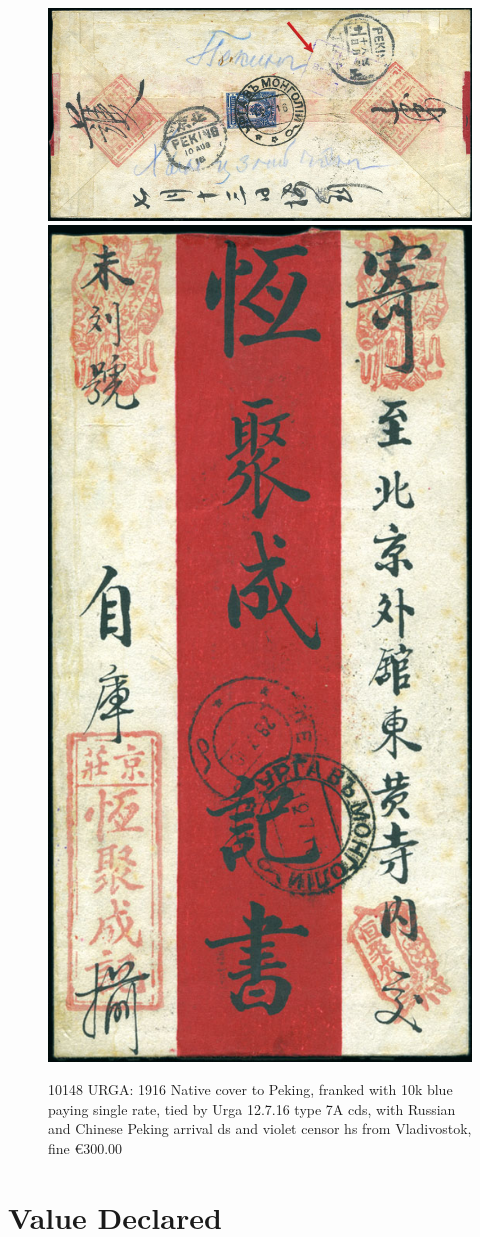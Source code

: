 \begin{figure}[htbp]
\centering
\includegraphics[width=.95\textwidth]{../russian-post-in-mongolia/10148.jpg}
\includegraphics[width=.50\textwidth]{../russian-post-in-mongolia/10148-1.jpg}
\caption{ 
10148	URGA: 1916 Native cover to Peking, franked with 10k blue paying
single rate, tied by Urga 12.7.16 type 7A cds, with Russian and Chinese 
Peking arrival ds and violet censor hs from Vladivostok, fine
\euro 300.00 
} 
\end{figure}  

\section{Value Declared}

